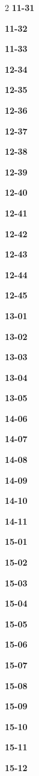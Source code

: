 \documentclass[10pt,a4paper]{article}
\begin{document}
\begin{multicols}{2}
\noindent\textbf{11-31}\ \par
\noindent\textbf{11-32}\ \par
\noindent\textbf{11-33}\ \par
\noindent\textbf{12-34}\ \par
\noindent\textbf{12-35}\ \par
\noindent\textbf{12-36}\ \par
\noindent\textbf{12-37}\ \par
\noindent\textbf{12-38}\ \par
\noindent\textbf{12-39}\ \par
\noindent\textbf{12-40}\ \par
\noindent\textbf{12-41}\ \par
\noindent\textbf{12-42}\ \par
\noindent\textbf{12-43}\ \par
\noindent\textbf{12-44}\ \par
\noindent\textbf{12-45}\ \par
\noindent\textbf{13-01}\ \par
\noindent\textbf{13-02}\ \par
\noindent\textbf{13-03}\ \par
\noindent\textbf{13-04}\ \par
\noindent\textbf{13-05}\ \par
\noindent\textbf{14-06}\ \par
\noindent\textbf{14-07}\ \par
\noindent\textbf{14-08}\ \par
\noindent\textbf{14-09}\ \par
\noindent\textbf{14-10}\ \par
\noindent\textbf{14-11}\ \par
\noindent\textbf{15-01}\ \par
\noindent\textbf{15-02}\ \par
\noindent\textbf{15-03}\ \par
\noindent\textbf{15-04}\ \par
\noindent\textbf{15-05}\ \par
\noindent\textbf{15-06}\ \par
\noindent\textbf{15-07}\ \par
\noindent\textbf{15-08}\ \par
\noindent\textbf{15-09}\ \par
\noindent\textbf{15-10}\ \par
\noindent\textbf{15-11}\ \par
\noindent\textbf{15-12}\ \par

\end{multicols}
\end{document}
